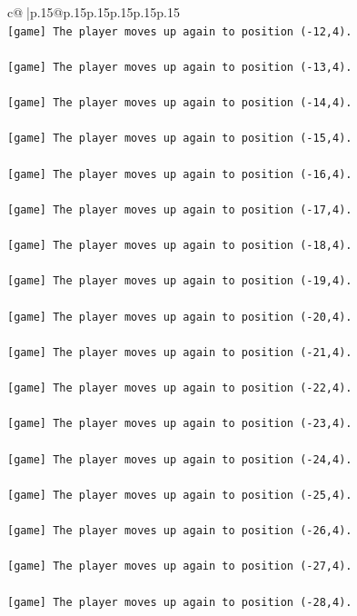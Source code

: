 \documentclass{article}
\begin{document}
{\begin{supertabular}{c@{$\;$}|p{.15\linewidth}@{}p{.15\linewidth}p{.15\linewidth}p{.15\linewidth}p{.15\linewidth}p{.15\linewidth}}
{{{\\ 
\texttt{{[}game{]} The player moves up again to position ({-}12,4).} \\
\\ 
\texttt{{[}game{]} The player moves up again to position ({-}13,4).} \\
\\ 
\texttt{{[}game{]} The player moves up again to position ({-}14,4).} \\
\\ 
\texttt{{[}game{]} The player moves up again to position ({-}15,4).} \\
\\ 
\texttt{{[}game{]} The player moves up again to position ({-}16,4).} \\
\\ 
\texttt{{[}game{]} The player moves up again to position ({-}17,4).} \\
\\ 
\texttt{{[}game{]} The player moves up again to position ({-}18,4).} \\
\\ 
\texttt{{[}game{]} The player moves up again to position ({-}19,4).} \\
\\ 
\texttt{{[}game{]} The player moves up again to position ({-}20,4).} \\
\\ 
\texttt{{[}game{]} The player moves up again to position ({-}21,4).} \\
\\ 
\texttt{{[}game{]} The player moves up again to position ({-}22,4).} \\
\\ 
\texttt{{[}game{]} The player moves up again to position ({-}23,4).} \\
\\ 
\texttt{{[}game{]} The player moves up again to position ({-}24,4).} \\
\\ 
\texttt{{[}game{]} The player moves up again to position ({-}25,4).} \\
\\ 
\texttt{{[}game{]} The player moves up again to position ({-}26,4).} \\
\\ 
\texttt{{[}game{]} The player moves up again to position ({-}27,4).} \\
\\ 
\texttt{{[}game{]} The player moves up again to position ({-}28,4).} \\
}}}
\end{supertabular}}
\end{document}
